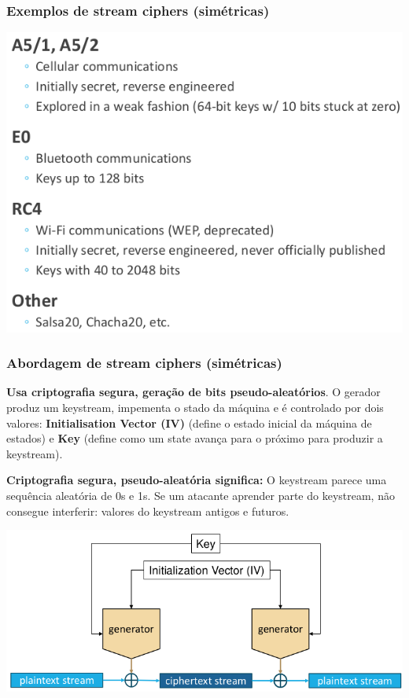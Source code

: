 \documentclass{article}
\begin{document}
\subsubsection{Exemplos de stream ciphers (simétricas)}

\begin{center}
  \includegraphics[scale=0.3]{71}
\end{center}

\subsubsection{Abordagem de stream ciphers (simétricas)}

\begin{flushleft}
  \textbf{Usa criptografia segura, geração de bits pseudo-aleatórios}.
  O gerador produz um keystream, impementa o stado da máquina e é controlado por
  dois valores: \textbf{Initialisation Vector (IV)} (define o
  estado inicial da máquina de estados) e \textbf{Key} (define como um
  state avança para o próximo para produzir a keystream).

  \vspace{2mm}

  \textbf{Criptografia segura, pseudo-aleatória significa:} O
  keystream parece uma sequência aleatória de 0s e 1s. Se um atacante
  aprender parte do keystream, não consegue interferir: valores do keystream
  antigos e futuros.
\end{flushleft}

\begin{center}
  \includegraphics[scale=0.3]{72}
\end{center}
\end{document}
